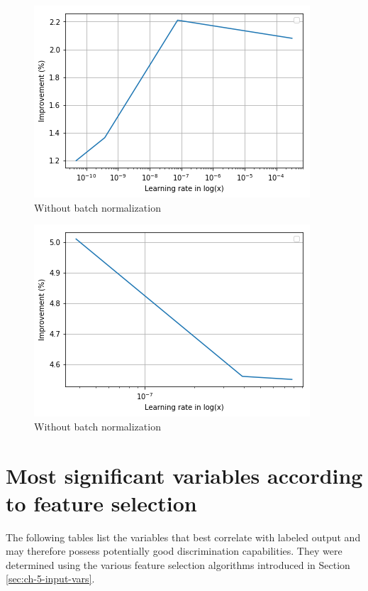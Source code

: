 \begin{figure}[h]
    \centering
    \includegraphics[width=.65\textwidth]{assets/appendix/plot_group1.png}
    \caption{Without batch normalization}
    \label{fig:ch_5_plot1}
\end{figure}
\begin{figure}[h]
    \centering
    \includegraphics[width=.65\textwidth]{assets/appendix/plot_group5.png}
    \caption{Without batch normalization}
    \label{fig:ch_5_plot5}
\end{figure}

\chapter{Most significant variables according to feature selection}
The following tables list the variables that best correlate with labeled output and may therefore possess potentially good discrimination capabilities. They were determined using the various feature selection algorithms introduced in Section \ref{sec:ch-5-input-vars}.


